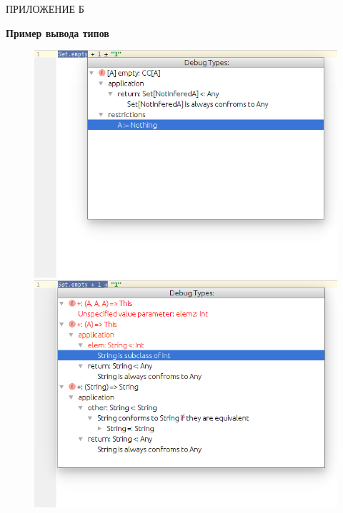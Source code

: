 \vfill
\clearpage
\newpage


\vfill
\clearpage
\appendix

\hfill ПРИЛОЖЕНИЕ Б
\begin{center}
  \textbf{Пример вывода типов}
\end{center}
\markboth{\MakeUppercase{}}{}

\begin{figure}[h!]
  \begin{minipage}{.5\linewidth}
  \centering
  \includegraphics[scale=.35]{img/infer1}
  \end{minipage}%
  \begin{minipage}{.5\linewidth}
  \centering
  \includegraphics[scale=.35]{img/infer3}

\end{minipage}
\end{figure}
